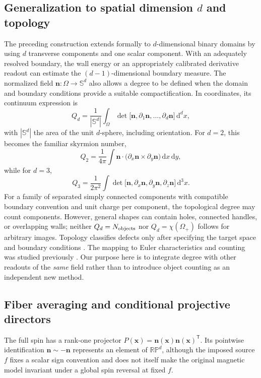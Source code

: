 \documentclass[11pt,a4paper]{article}
\newcommand{\nn}{\bm n}
\newcommand{\xx}{\bm x}
\newcommand{\dd}{\mathrm{d}}
\newcommand{\RP}{\mathbb{RP}}
\newcommand{\Sn}{\mathbb S}
\newcommand{\diff}{\partial}
\begin{document}
\subsection{Generalization to spatial dimension \texorpdfstring{$d$}{d} and topology}\label{subsec:theory:topology}
The preceding construction extends formally to \(d\)-dimensional binary domains by using \(d\) transverse components and one scalar component. With an adequately resolved boundary, the wall energy or an appropriately calibrated derivative readout can estimate the \((d-1)\)-dimensional boundary measure. The normalized field \(\nn: \Omega\rightarrow\Sn^d\) also allows a degree to be defined when the domain and boundary conditions provide a suitable compactification. In coordinates, its continuum expression is
\begin{equation}
 Q_d=\frac{1}{|\Sn^d|}\int_{\Omega}\det\!\bigl[\nn,\diff_1\nn,\ldots,\diff_d\nn\bigr]\,\dd^dx,
 \label{eq:degreegeneral}
\end{equation}
with \(|\Sn^d|\) the area of the unit \(d\)-sphere, including orientation. For \(d=2\), this becomes the familiar skyrmion number,
\begin{equation}
 Q_2=\frac{1}{4\pi}\int\nn\cdot\bigl(\diff_x\nn\times\diff_y\nn\bigr)\,\dd x\,\dd y,
 \label{eq:skyrmion}
\end{equation}
while for \(d=3\),
\begin{equation}
 Q_3=\frac{1}{2\pi^2}\int\det\!\bigl[\nn,\diff_x\nn,\diff_y\nn,\diff_z\nn\bigr]\,\dd^3x.
 \label{eq:degree3}
\end{equation}
For a family of separated simply connected components with compatible boundary convention and unit charge per component, the topological degree may count components. However, general shapes can contain holes, connected handles, or overlapping walls; neither \(Q_d=N_{\rm objects}\) nor \(Q_d=\chi(\Omega_+)\) follows for arbitrary images. Topology classifies defects only after specifying the target space and boundary conditions \cite{Mermin1979}. The mapping to Euler characteristics and counting was studied previously \cite{Park2024AMT,Moon2025SR}. Our purpose here is to integrate degree with other readouts of the \emph{same} field rather than to introduce object counting as an independent new method.

\subsection{Fiber averaging and conditional projective directors}\label{subsec:theory:projective}
The full spin has a rank-one projector \(P(\xx)=\nn(\xx)\nn(\xx)^{\mathsf T}\). Its pointwise identification \(\nn\sim-\nn\) represents an element of \(\RP^d\), although the imposed source \(f\) fixes a scalar sign convention and does not itself make the original magnetic model invariant under a global spin reversal at fixed \(f\).
\end{document}

